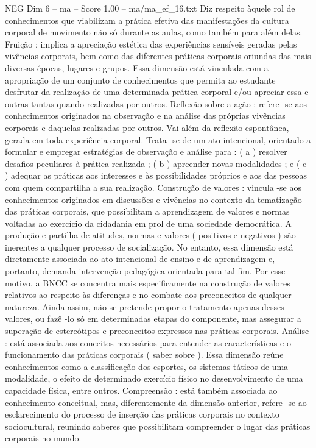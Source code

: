 \begin{textsample}{NEG Dim 6 – ma – Score 1.00 – ma/ma\_ef\_16.txt}
Diz respeito àquele rol de conhecimentos que viabilizam a prática efetiva das manifestações da cultura corporal de movimento não só durante as aulas, como também para além delas.
Fruição : implica a apreciação estética das experiências sensíveis geradas pelas vivências corporais, bem como das diferentes práticas corporais oriundas das mais diversas épocas, lugares e grupos.
Essa dimensão está vinculada com a apropriação de um conjunto de conhecimentos que permita ao estudante desfrutar da realização de uma determinada prática corporal e/ou apreciar essa e outras tantas quando realizadas por outros.
Reflexão sobre a ação : refere -se aos conhecimentos originados na observação e na análise das próprias vivências corporais e daquelas realizadas por outros.
Vai além da reflexão espontânea, gerada em toda experiência corporal.
Trata -se de um ato intencional, orientado a formular e empregar estratégias de observação e análise para : ( a ) resolver desafios peculiares à prática realizada ; ( b ) apreender novas modalidades ; e ( c ) adequar as práticas aos interesses e às possibilidades próprios e aos das pessoas com quem compartilha a sua realização.
Construção de valores : vincula -se aos conhecimentos originados em discussões e vivências no contexto da tematização das práticas corporais, que possibilitam a aprendizagem de valores e normas voltadas ao exercício da cidadania em prol de uma sociedade democrática.
A produção e partilha de atitudes, normas e valores ( positivos e negativos ) são inerentes a qualquer processo de socialização.
No entanto, essa dimensão está diretamente associada ao ato intencional de ensino e de aprendizagem e, portanto, demanda intervenção pedagógica orientada para tal fim.
Por esse motivo, a BNCC se concentra mais especificamente na construção de valores relativos ao respeito às diferenças e no combate aos preconceitos de qualquer natureza.
Ainda assim, não se pretende propor o tratamento apenas desses valores, ou fazê -lo só em determinadas etapas do componente, mas assegurar a superação de estereótipos e preconceitos expressos nas práticas corporais.
Análise : está associada aos conceitos necessários para entender as características e o funcionamento das práticas corporais ( saber sobre ).
Essa dimensão reúne conhecimentos como a classificação dos esportes, os sistemas táticos de uma modalidade, o efeito de determinado exercício físico no desenvolvimento de uma capacidade física, entre outros.
Compreensão : está também associada ao conhecimento conceitual, mas, diferentemente da dimensão anterior, refere -se ao esclarecimento do processo de inserção das práticas corporais no contexto sociocultural, reunindo saberes que possibilitam compreender o lugar das práticas corporais no mundo.

\end{textsample}
